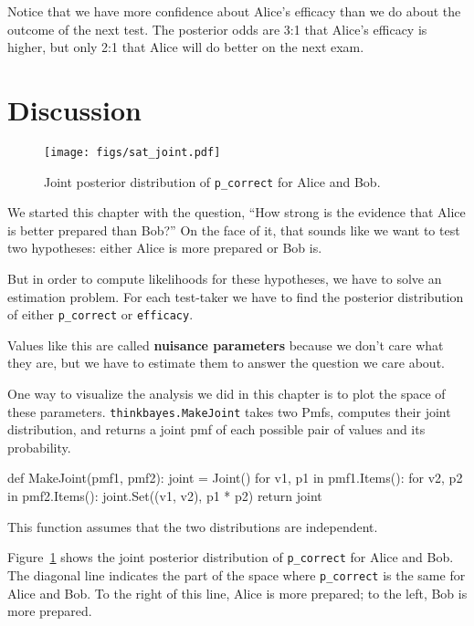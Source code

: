 \documentclass[12pt]{book}
\theoremstyle{exercise}
\newcommand{\py}[1]{{\tt #1}}%
\begin{document}
Notice that we have more confidence about Alice's efficacy than we do
about the outcome of the next test.  The posterior odds are 3:1 that
Alice's efficacy is higher, but only 2:1 that Alice will do better on
the next exam.


\section{Discussion}

\begin{figure}
\centerline{\texttt{[image: figs/sat\_joint.pdf]}}
\caption{Joint posterior distribution of \py{p_correct} for Alice and Bob.}
\label{fig.satjoint}
\end{figure}

We started this chapter with the question,
``How strong is the evidence that Alice is better prepared
than Bob?''  On the face of it, that sounds like we want to
test two hypotheses: either Alice is more prepared or Bob is.

But in order to compute likelihoods for these hypotheses, we
have to solve an estimation problem.  For each test-taker
we have to find the posterior distribution of either
\verb"p_correct" or \verb"efficacy".

Values like this are called {\bf nuisance parameters} because
we don't care what they are, but we have
to estimate them to answer the question we care about.

One way to visualize the analysis we did in this chapter is
to plot the space of these parameters.  \verb"thinkbayes.MakeJoint"
takes two Pmfs, computes their joint distribution, and returns
a joint pmf of each possible pair of values and its probability.

\begin{code}
def MakeJoint(pmf1, pmf2):
    joint = Joint()
    for v1, p1 in pmf1.Items():
        for v2, p2 in pmf2.Items():
            joint.Set((v1, v2), p1 * p2)
    return joint
\end{code}

This function assumes that the two distributions are independent.

Figure~\ref{fig.satjoint} shows the joint posterior distribution of
\verb"p_correct" for Alice and Bob.  The diagonal line indicates the
part of the space where \verb"p_correct" is the same for Alice and
Bob.  To the right of this line, Alice is more prepared; to the left,
Bob is more prepared.
\end{document}
